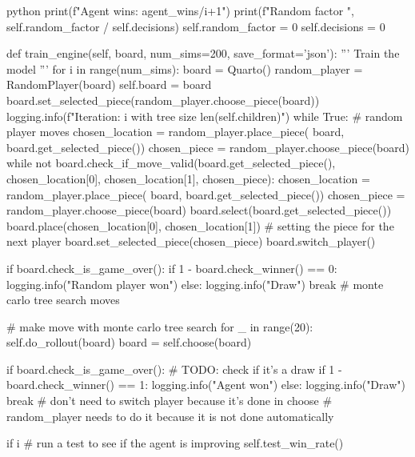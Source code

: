 \begin{mintedbox}{python}
        print(f"Agent wins: {agent_wins}/{i+1}")
        print(f"Random factor ", self.random_factor / self.decisions)
        self.random_factor = 0
        self.decisions = 0

    def train_engine(self, board, num_sims=200, save_format='json'):
        '''
        Train the model
        '''
        for i in range(num_sims):
            board = Quarto()
            random_player = RandomPlayer(board)
            self.board = board
            board.set_selected_piece(random_player.choose_piece(board))
            logging.info(f"Iteration: {i} with tree size {len(self.children)}")
            while True:
                # random player moves
                chosen_location = random_player.place_piece(
                    board, board.get_selected_piece())
                chosen_piece = random_player.choose_piece(board)
                while not board.check_if_move_valid(board.get_selected_piece(), chosen_location[0], chosen_location[1], chosen_piece):
                    chosen_location = random_player.place_piece(
                        board, board.get_selected_piece())
                    chosen_piece = random_player.choose_piece(board)
                board.select(board.get_selected_piece())
                board.place(chosen_location[0], chosen_location[1])
                # setting the piece for the next player
                board.set_selected_piece(chosen_piece)
                board.switch_player()

                if board.check_is_game_over():
                    if 1 - board.check_winner() == 0:
                        logging.info("Random player won")
                    else:
                        logging.info("Draw")
                    break
                # monte carlo tree search moves

                # make move with monte carlo tree search
                for _ in range(20):
                    self.do_rollout(board)
                board = self.choose(board)

                if board.check_is_game_over():
                    # TODO: check if it's a draw
                    if 1 - board.check_winner() == 1:
                        logging.info("Agent won")
                    else:
                        logging.info("Draw")
                    break
                # don't need to switch player because it's done in choose
                # random_player needs to do it because it is not done automatically

            if i %
                # run a test to see if the agent is improving
                self.test_win_rate()


\end{mintedbox}
